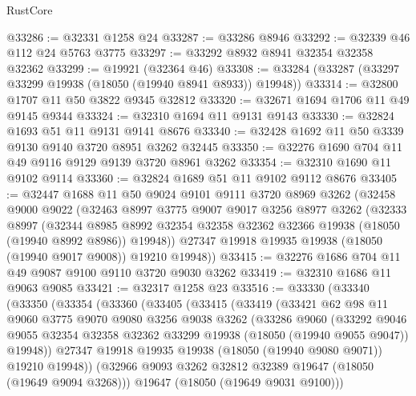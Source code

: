 \begin{lexlean}{RustCore}
\begin{coremodule}
@33286 := @32331 @1258 @24
@33287 := @33286 @8946
@33292 := @32339 @46 @112 @24 @5763 @3775
@33297 := @33292 @8932 @8941 @32354 @32358 @32362
@33299 := @19921 (@32364 @46)
@33308 := @33284 (@33287 (@33297 @33299 @19938 (@18050 (@19940 @8941 @8933)) @19948))
@33314 := @32800 @1707 @11 @50 @3822 @9345 @32812
@33320 := @32671 @1694 @1706 @11 @49 @9145 @9344
@33324 := @32310 @1694 @11 @9131 @9143
@33330 := @32824 @1693 @51 @11 @9131 @9141 @8676
@33340 := @32428 @1692 @11 @50 @3339 @9130 @9140 @3720 @8951 @3262 @32445
@33350 := @32276 @1690 @704 @11 @49 @9116 @9129 @9139 @3720 @8961 @3262
@33354 := @32310 @1690 @11 @9102 @9114
@33360 := @32824 @1689 @51 @11 @9102 @9112 @8676
@33405 := @32447
    @1688
    @11
    @50
    @9024
    @9101
    @9111
    @3720
    @8969
    @3262
    (@32458
      @9000
      @9022
      (@32463
        @8997
        @3775
        @9007
        @9017
        @3256
        @8977
        @3262
        (@32333
          @8997
          (@32344
            @8985
            @8992
            @32354
            @32358
            @32362
            @32366
            @19938
            (@18050 (@19940 @8992 @8986))
            @19948))
        @27347
        @19918
        @19935
        @19938
        (@18050 (@19940 @9017 @9008))
        @19210
        @19948))
@33415 := @32276 @1686 @704 @11 @49 @9087 @9100 @9110 @3720 @9030 @3262
@33419 := @32310 @1686 @11 @9063 @9085
@33421 := @32317 @1258 @23
@33516 := @33330
    (@33340
      (@33350
        (@33354
          (@33360
            (@33405
              (@33415
                (@33419
                  (@33421
                    @62
                    @98
                    @11
                    @9060
                    @3775
                    @9070
                    @9080
                    @3256
                    @9038
                    @3262
                    (@33286
                      @9060
                      (@33292
                        @9046
                        @9055
                        @32354
                        @32358
                        @32362
                        @33299
                        @19938
                        (@18050 (@19940 @9055 @9047))
                        @19948))
                    @27347
                    @19918
                    @19935
                    @19938
                    (@18050 (@19940 @9080 @9071))
                    @19210
                    @19948))
                (@32966 @9093 @3262 @32812 @32389 @19647 (@18050 (@19649 @9094 @3268)))
                @19647
                (@18050 (@19649 @9031 @9100)))

\end{coremodule}
\end{lexlean}
